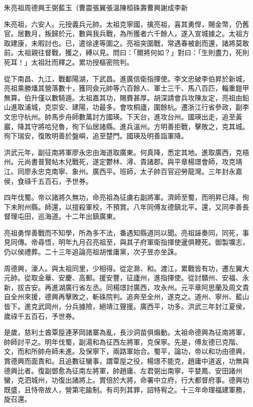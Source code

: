 
\begin{pinyinscope}
朱亮祖周德興王弼藍玉（曹震張翼張溫陳桓硃壽曹興謝成李新

朱亮祖，六安人。元授義兵元帥。太祖克寧國，擒亮祖，喜其勇悍，賜金幣，仍舊官。居數月，叛歸於元，數與我兵戰，為所獲者六千餘人，遂入宣城據之。太祖方取建康，未暇討也。已，遣徐達等圍之。亮祖突圍戰，常遇春被創而還，諸將莫敢前。太祖親往督戰，獲之，縛以見。問曰：「爾將何如？」對曰：「生則盡力，死則死耳！」太祖壯而釋之。累功授樞密院判。

從下南昌、九江，戰鄱陽湖，下武昌。進廣信衛指揮使。李文忠破李伯昇於新城，亮祖乘勝燔其營落數十，獲同僉元帥等六百餘人、軍士三千、馬八百匹，輜重鎧甲無算。伯升僅以數騎遁。太祖嘉其功，賜賚甚厚。胡深請會兵攻陳友定，亮祖由鉛山進取浦城，克崇安、建陽，功最多。會攻桐廬，圍餘杭。遷浙江行省參政，副李文忠守杭州。帥馬步舟師數萬討方國瑛。下天台，進攻台州。國瑛出走，追至黃巖，降其守將哈兒魯，徇下仙居諸縣。進兵溫州。方明善拒戰，擊敗之，克其城。徇下瑞安，復敗明善於盤嶼，追至楚門。國瑛及明善詣軍降。

洪武元年，副征南將軍廖永忠由海道取廣東。何真降，悉定其地。進取廣西，克梧州。元尚書普賢帖木兒戰死，遂定鬱林、潯、貴諸郡。與平章楊璟會師，攻克靖江。同廖永忠克南寧、象州。廣西平。班師，太子帥百官迎勞龍灣。三年封永嘉侯，食祿千五百石，予世券。

四年伐蜀。帝以諸將久無功，命亮祖為征虜右副將軍。濟師至蜀，而明昇已降。徇下未附州縣。師還，以擅殺軍校，不預賞。八年同傅友德鎮北平。還，又同李善長督理屯田，巡海道。十二年出鎮廣東。

亮祖勇悍善戰而不知學，所為多不法，番遇知縣道同以聞。亮祖誣奏同，同死，事見同傳。帝尋悟，明年九月召亮祖至，與其子府軍衛指揮使暹俱鞭死。御製壙志，仍以侯禮葬。二十三年追論亮祖胡惟庸黨，次子昱亦坐誅。

周德興，濠人。與太祖同里，少相得。從定滁、和。渡江，累戰皆有功，遷左翼大元帥。從取金華、安慶、高郵。援安豐，征廬州，進指揮使。從討贛州、安福、永新，拔吉安。再進湖廣行省左丞。同楊璟討廣西，攻永州。元平章阿思蘭及周文貴自全州來援，德興再擊敗之，斬硃院判。追奔至全州，遂克之。道州、寧州、藍山皆下。進克武岡州，分兵據險，絕靖江聲援。廣西平，功多。洪武三年封江夏侯，歲祿千五百石，予世券。

是歲，慈利土酋覃垕連茅岡諸寨為亂，長沙洞苗俱煽動。太祖命德興為征南將軍，帥師討平之。明年伐蜀，副湯和為征西左將軍，克保寧。先是，傅友德已克階、文，而和所帥舟師未進。及保寧下，兩路軍始合。蜀平，論功，帝以和功由德興，賞德興而面責和。且追數征蠻事，謂覃垕之役，楊璟不能克，趙庸中道返，功無與德興比者。復副鄧愈為征南左將軍，帥趙庸、左君弼出南寧，平婪鳳、安田諸州蠻，克泗城州，功復出諸將上。賞倍於大將，命署中立府，行大都督府事。德興功既盛，且恃帝故人，營第宅踰制。有司列其罪，詔特宥之。十三年命理福建軍務，旋召還。


\end{pinyinscope}
